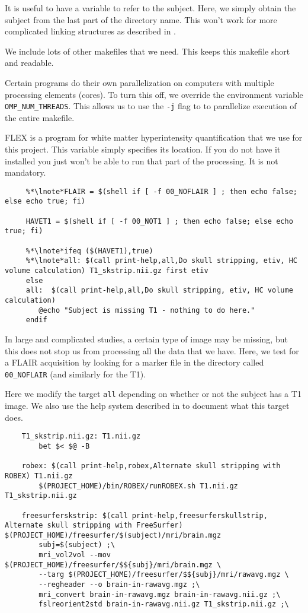  It is useful to have a variable to refer to the
subject. Here, we simply obtain the subject from the last part of the
directory name. This won't work for more complicated linking
structures as described in . 

 We include lots of other makefiles that we need. This keeps
this makefile short and readable. 

 Certain programs do their own parallelization on computers
with multiple processing elements (cores). To turn this off, we
override the environment variable \texttt{OMP_NUM_THREADS}. This
allows us to use the \texttt{-j} flag to \maken{} to parallelize
execution of the entire makefile.

 FLEX is a program for white matter hyperintensity
quantification that we use for this project. This variable simply
specifies its location. If you do not have it installed you just won't
be able to run that part of the processing. It is not mandatory. 

\begin{lstlisting}
	 %*\lnote*FLAIR = $(shell if [ -f 00_NOFLAIR ] ; then echo false; else echo true; fi)

	 HAVET1 = $(shell if [ -f 00_NOT1 ] ; then echo false; else echo true; fi)

	 %*\lnote*ifeq ($(HAVET1),true)
	 %*\lnote*all: $(call print-help,all,Do skull stripping, etiv, HC volume calculation) T1_skstrip.nii.gz first etiv
	 else
	 all:  $(call print-help,all,Do skull stripping, etiv, HC volume calculation)
		@echo "Subject is missing T1 - nothing to do here."
	 endif
\end{lstlisting}

 In large and complicated studies, a certain type of image may
be missing, but this does not stop us from processing all the data
that we have. Here, we test for a FLAIR acquisition by looking for a
marker file in the directory called \texttt{00_NOFLAIR} (and similarly
for the T1). 

 Here we modify the target \texttt{all} depending on whether
or not the subject has a T1 image. We also use the help system
described in  to document what this target
does. 


\begin{lstlisting}
	T1_skstrip.nii.gz: T1.nii.gz 
		bet $< $@ -B

	robex: $(call print-help,robex,Alternate skull stripping with ROBEX) T1.nii.gz 
		$(PROJECT_HOME)/bin/ROBEX/runROBEX.sh T1.nii.gz T1_skstrip.nii.gz

	freesurferskstrip: $(call print-help,freesurferskullstrip, Alternate skull stripping with FreeSurfer) $(PROJECT_HOME)/freesurfer/$(subject)/mri/brain.mgz
		subj=$(subject) ;\
		mri_vol2vol --mov $(PROJECT_HOME)/freesurfer/$${subj}/mri/brain.mgz \
		--targ $(PROJECT_HOME)/freesurfer/$${subj}/mri/rawavg.mgz \
		--regheader --o brain-in-rawavg.mgz ;\
		mri_convert brain-in-rawavg.mgz brain-in-rawavg.nii.gz ;\
		fslreorient2std brain-in-rawavg.nii.gz T1_skstrip.nii.gz ;\
\end{lstlisting}

